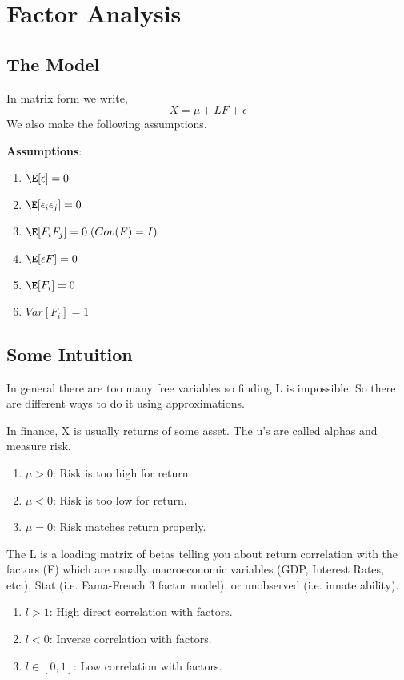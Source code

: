 \documentclass[twoside]{article}
\begin{document}
\section{Factor Analysis}

\subsection{The Model}
In matrix form we write,
$$X = \mu + LF + \epsilon$$
We also make the following assumptions.

\textbf{Assumptions}: 
\begin{enumerate}
\item $\E[\epsilon] = 0$
\item $\E[\epsilon_i\epsilon_j] = 0$
\item $\E[F_iF_j] = 0 \; (Cov(F) = I)$
\item $\E[\epsilon F] = 0$
\item $\E[F_i] = 0$
\item $Var[F_i] = 1$
\end{enumerate}

\subsection{Some Intuition}
In general there are too many free variables so finding L is impossible. So there are different ways to do it using approximations.

In finance, X is usually returns of some asset. The u's are called alphas and measure risk. 
\begin{enumerate}
  \item $\mu > 0$: Risk is too high for return.
  \item $\mu<0$: Risk is too low for return.
  \item $\mu = 0$: Risk matches return properly.
\end{enumerate}
The L is a loading matrix of betas telling you about return correlation with the factors (F) which are usually macroeconomic variables (GDP, Interest Rates, etc.), Stat (i.e. Fama-French 3 factor model), or unobserved (i.e. innate ability). 

\begin{enumerate}
  \item $l > 1$: High direct correlation with factors.
  \item $l < 0$: Inverse correlation with factors.
  \item $l \in [0,1]$: Low correlation with factors.
\end{enumerate}
\end{document}

